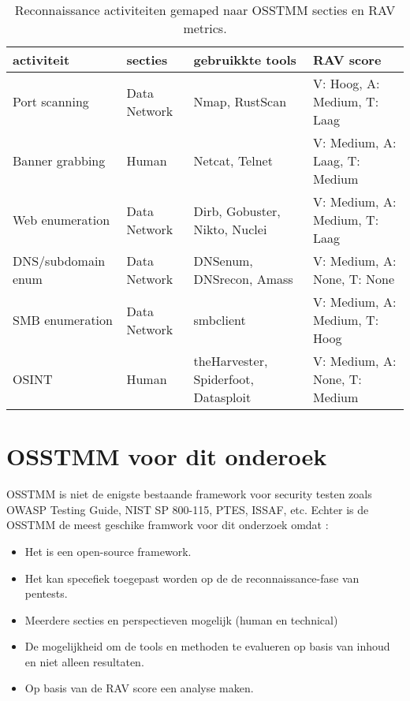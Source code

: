 \begin{table}[H]
  \centering
  \footnotesize
  \begin{tabularx}{\linewidth}{l l X l}
    \toprule
    \textbf{activiteit} & \textbf{secties} & \textbf{gebruikkte tools} & \textbf{RAV score} \\
    \midrule
    Port scanning       & Data Network & Nmap, RustScan                       & V: Hoog,   A: Medium, T: Laag \\
    Banner grabbing     & Human        & Netcat, Telnet                       & V: Medium, A: Laag,   T: Medium \\
    Web enumeration     & Data Network & Dirb, Gobuster, Nikto, Nuclei        & V: Medium, A: Medium, T: Laag \\
    DNS/subdomain enum  & Data Network & DNSenum, DNSrecon, Amass             & V: Medium, A: None,   T: None \\
    SMB enumeration     & Data Network & smbclient                            & V: Medium, A: Medium, T: Hoog \\
    OSINT               & Human        & theHarvester, Spiderfoot, Datasploit & V: Medium, A: None,   T: Medium \\
    \bottomrule
  \end{tabularx}
  \caption[activiteieten in OSSTMM]{\label{tab:recon}Reconnaissance activiteiten gemaped naar OSSTMM secties en RAV metrics.}
\end{table}

\section{OSSTMM voor dit onderoek}

OSSTMM is niet de enigste bestaande framework voor security testen zoals OWASP Testing Guide, NIST SP 800-115, PTES, ISSAF, etc.
Echter is de OSSTMM de meest geschike framwork voor dit onderzoek omdat :

\begin{itemize}
  \item Het is een open-source framework.
  \item Het kan specefiek toegepast worden op de de reconnaissance-fase van pentests.
  \item Meerdere secties en perspectieven mogelijk (human en technical)
  \item De mogelijkheid om de tools en methoden te evalueren op basis van inhoud en niet alleen resultaten.
  \item Op basis van de RAV score een analyse maken.
\end{itemize}


